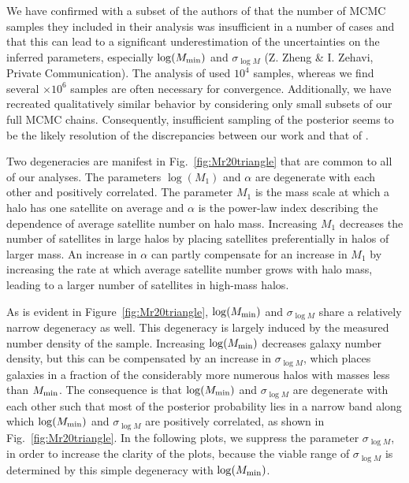 \documentclass[usenatbib,usegraphicx,letterpaper]{mn2e}
\begin{document}
We have confirmed with a subset of the authors of \citet{zehavi_etal11} 
that the number of MCMC samples they included in their analysis was 
insufficient in a number of cases and that this can lead to a significant underestimation of the uncertainties 
on the inferred parameters, especially $\log (M_{\rm min})$ and $\sigma_{\log M}$ 
(Z. Zheng \& I. Zehavi, Private Communication). The analysis of \citet{zehavi_etal11} 
used $10^4$ samples, whereas we find several $\times 10^6$ samples are often necessary for convergence. 
Additionally, we have recreated qualitatively similar behavior by considering only small subsets of our 
full MCMC chains. Consequently, insufficient sampling of the posterior seems to be the likely resolution 
of the discrepancies between our work and that of \citet{zehavi_etal11}.

Two degeneracies are manifest in Fig.~\ref{fig:Mr20triangle} that are common to all of our 
analyses. The parameters $\log (M_1)$ and $\alpha$ are degenerate with each other and positively 
correlated. The parameter $M_1$ is the mass scale at which a halo has one satellite on 
average and $\alpha$ is the power-law index describing the dependence of average satellite 
number on halo mass. Increasing $M_1$ decreases the number of satellites in large halos 
by placing satellites preferentially in halos of larger mass. An increase in $\alpha$ can partly 
compensate for an increase in $M_1$ by increasing the rate at which average satellite number 
grows with halo mass, leading to a larger number of satellites in high-mass halos. 

As is evident in Figure~\ref{fig:Mr20triangle}, $\log (M_{\rm min})$ and $\sigma_{\log M}$ 
share a relatively narrow degeneracy as well. This degeneracy is largely induced by the 
measured number density of the sample. Increasing $\log (M_{\rm min})$ decreases galaxy 
number density, but this can be compensated by an increase in $\sigma_{\log M}$, which 
places galaxies in a fraction of the considerably more numerous halos with masses less 
than $M_{\rm min}$. The consequence is that $\log (M_{\rm min})$ and $\sigma_{\log M}$ are 
degenerate with each other such that most of the posterior probability lies in a narrow band 
along which $\log (M_{\rm min})$ and $\sigma_{\log M}$ are positively correlated, as shown in 
Fig.~\ref{fig:Mr20triangle}. In the following plots, we suppress the parameter $\sigma_{\log M}$,  
in order to increase the clarity of the plots, because the viable range of $\sigma_{\log M}$ is 
determined by this simple degeneracy with $\log (M_{\rm min})$. 
\end{document}
